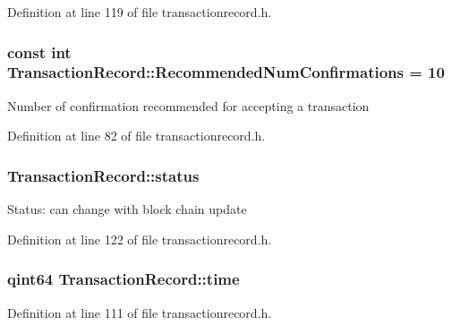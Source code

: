 Definition at line 119 of file transactionrecord.\+h.

\hypertarget{class_transaction_record_a1cdf534b1ab2495c839f87beb053eaf8}{}
\subsubsection[{Recommended\+Num\+Confirmations}]{\setlength{\rightskip}{0pt plus 5cm}const int Transaction\+Record\+::\+Recommended\+Num\+Confirmations = 10\hspace{0.3cm}{\ttfamily [static]}}\label{class_transaction_record_a1cdf534b1ab2495c839f87beb053eaf8}
Number of confirmation recommended for accepting a transaction 

Definition at line 82 of file transactionrecord.\+h.

\hypertarget{class_transaction_record_a50342213092284a9994f2903991134c0}{}
\subsubsection[{status}]{ Transaction\+Record\+::status}\label{class_transaction_record_a50342213092284a9994f2903991134c0}
Status\+: can change with block chain update 

Definition at line 122 of file transactionrecord.\+h.

\hypertarget{class_transaction_record_afd105941a1ce3788f86573d17e999a8e}{}
\subsubsection[{time}]{\setlength{\rightskip}{0pt plus 5cm}qint64 Transaction\+Record\+::time}\label{class_transaction_record_afd105941a1ce3788f86573d17e999a8e}


Definition at line 111 of file transactionrecord.\+h.

\hypertarget{class_transaction_record_a6a68c861c3f1f10971fa11d8fc7c46e1}{}
